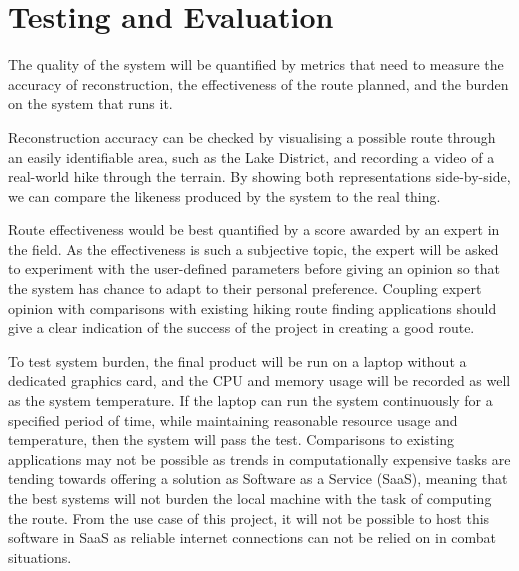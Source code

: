 \documentclass[12pt,a4paper]{article}
\begin{document}
\section{Testing and Evaluation}
\noindent The quality of the system will be quantified by metrics that need to measure the accuracy of reconstruction, the effectiveness of the route planned, and the burden on the system that runs it.
\par Reconstruction accuracy can be checked by visualising a possible route through an easily identifiable area, such as the Lake District, and recording a video of a real-world hike through the terrain. By showing both representations side-by-side, we can compare the likeness produced by the system to the real thing.
\par Route effectiveness would be best quantified by a score awarded by an expert in the field. As the effectiveness is such a subjective topic, the expert will be asked to experiment with the user-defined parameters before giving an opinion so that the system has chance to adapt to their personal preference. Coupling expert opinion with comparisons with existing hiking route finding applications should give a clear indication of the success of the project in creating a good route.
\par To test system burden, the final product will be run on a laptop without a dedicated graphics card, and the CPU and memory usage will be recorded as well as the system temperature. If the laptop can run the system continuously for a specified period of time, while maintaining reasonable resource usage and temperature, then the system will pass the test. Comparisons to existing applications may not be possible as trends in computationally expensive tasks are tending towards offering a solution as Software as a Service (SaaS), meaning that the best systems will not burden the local machine with the task of computing the route. From the use case of this project, it will not be possible to host this software in SaaS as reliable internet connections can not be relied on in combat situations.


\end{document}
